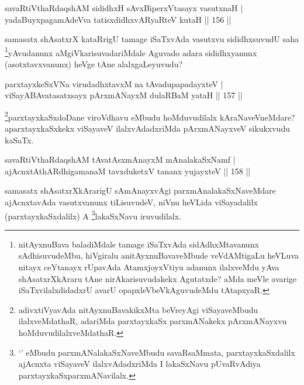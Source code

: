 \begin{shl}
savaRtiVthaRdaqshAM sididhxH sAvxBiperxVtasayx vasutxnaH | \\
yadaBuyxpagamAdeVva tatisxdidhxvARyaRteV kutaH \hfill||  156 ||  
\end{shl}

\begin{artha}
samasatx shAsatxrX kataRrigU tamage iSaTxvAda vasutxvu sididhxsuvudU saha \footnote{nitAyxnuBava baladiMdale tamage iSaTxvAda sidAdhxMtavanunx sAdhisuvudeMbu, hiVgiralu anitAyxnuBavaveMbude veVdAMtigaLu heVLuva nitayx ceYtanayx rUpavAda AtamxjoyxVtiyu adanunx ilalxveMdu yAva shAsatxrXkAraru tAne nirAkarisuvudakekx Agutatxde? aMda meVle avarige iSaTxvilalxdidadxrU avarU opapxleVbeVkAguvudeMdu tAtapxyaR.}yAvudanunx aMgiVkarisuvadariMdale Aguvado adara sididhxyanunx (asotxtavxvanunx) heVge tAne alalxgaLeyuvudu?
\end{artha}


\begin{shl}
parxtayxkeSxVNa virudadhxtavxM na tAvadupapadayxteV | \\
viSayABAvatasatxsayx pArxmANayxM dulaRBaM yataH \hfill||  157 ||  
\end{shl}

\begin{artha}
\footnote{adivxtiVyavAda nitAyxnuBavakikxMta beVreyAgi viSayaveMbudu ilalxveMdathaR, adariMda parxtayxkaSx parxmANakekx pArxmANayxvu hoMduvudilalxveMdathaR.}parxtayxkaSxdoDane viroVdhavu eMbudu hoMduvudilalx kAraNaveVneMdare? aparxtayxkaSxkekx viSayaveV ilalxvAdadxriMda pArxmANayxveV sikukxvudu kaSaTx.
\end{artha}

\begin{shl}
savaRtiVthaRdaqshAM tAvatAsxmAnayxM mAnalakaSxNamf | \\
ajAcnxtAthARdhigamanaM tavxduketxV tananx yujayxteV \hfill||  158 ||  
\end{shl}

\begin{artha}
samasatx shAsatxrXkArarigU sAmAnayxvAgi parxmAnalakaSxNaveMdare ajAcnxtavAda vasutxvanunx tiLisuvudeV, niVnu heVLida viSayadalilx (parxtayxkaSxdalilx) A \footnote{`\stext' eMbudu parxmANalakaSxNaveMbudu savaRsaMmata, parxtayxkaSxdalilx ajAcnxta viSayaveV ilalxvAdadxriMda I lakaSxNavu pUvaRvAdiya parxtayxkaSxparxmANavilalx.}lakaSxNavu iruvudilalx.
\end{artha}

